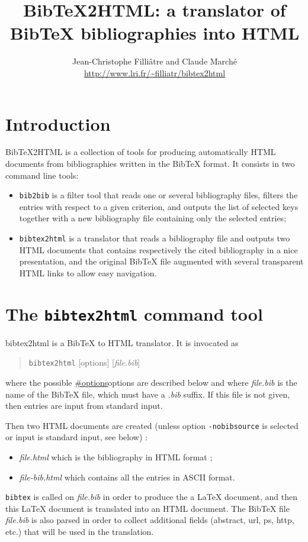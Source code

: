 \documentclass[11pt,a4paper]{article}
\newcommand{\monurl}[1]{#1}
\begin{document}
\title{BibTeX2HTML: a translator of BibTeX bibliographies into HTML}
\author{Jean-Christophe Filli\^{a}tre and Claude March\'e \\
        \normalsize\monurl{\url{http://www.lri.fr/~filliatr/bibtex2html}}}
\date{}
\maketitle

\tableofcontents


\section{Introduction}

BibTeX2HTML is a collection of tools for producing automatically HTML
documents from bibliographies written in the BibTeX format. It
consists in two command line tools:
\begin{itemize}
\item \texttt{bib2bib} is a filter tool that reads one or several
  bibliography files, filters the entries with respect to a given
  criterion, and outputs the list of selected keys together with a new
  bibliography file containing only the selected entries;
\item \texttt{bibtex2html} is a translator that reads a bibliography
  file and outputs two HTML documents that contains respectively the
  cited bibliography in a nice presentation, and the original BibTeX
  file augmented with several transparent HTML links to allow easy
  navigation. 
\end{itemize}

\section{The \texttt{bibtex2html} command tool}

bibtex2html is a BibTeX to HTML translator. It is invocated as 
\begin{quote}
\texttt{bibtex2html} [options] [\textit{file.bib}]
\end{quote}
where the possible \url{#options}{options} are described below and
where \textit{file.bib} is the name of the BibTeX file, which must
have a \textit{.bib} suffix. If this file is not given, then entries
are input from standard input.


Then two HTML documents are created (unless option
\verb|-nobibsource| is selected or input is standard input, see below) : 
\begin{itemize}
\item \textit{file.html} which is the bibliography in HTML format
;
\item \textit{file-bib.html} which contains all the entries in ASCII
  format.
\end{itemize}
\texttt{bibtex} is called on \textit{file.bib} in order to produce the
a LaTeX document, and then this LaTeX document is translated into an
HTML document.  The BibTeX file \textit{file.bib} is also parsed in
order to collect additional fields (abstract, url, ps, http, etc.)
that will be used in the translation.
\end{document}
